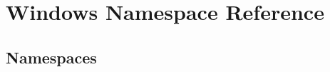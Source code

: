 \hypertarget{namespace_windows}{}\section{Windows Namespace Reference}
\label{namespace_windows}
\subsection*{Namespaces}
\begin{DoxyCompactItemize}
\end{DoxyCompactItemize}
